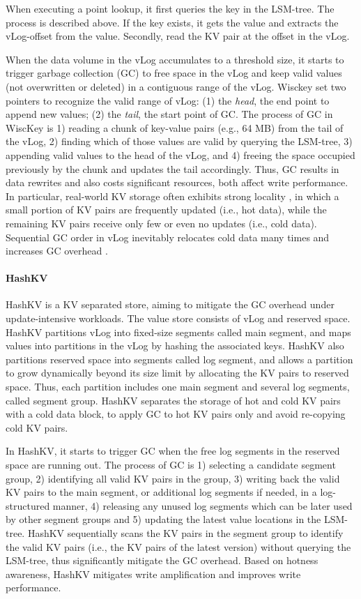 \documentclass[sigconf]{acmart}
\begin{document}
When executing a point lookup, it first queries the key in the LSM-tree. The process is described above. If the key exists, it gets the value and extracts the vLog-offset from the value. Secondly, read the KV pair at the offset in the vLog.

When the data volume in the vLog accumulates to a threshold size, it starts to trigger garbage collection (GC) to free space in the vLog and keep valid values (not overwritten or deleted) in a contiguous range of the vLog. Wisckey set two pointers to recognize the valid range of vLog: (1) the \textit{head}, the end point to append new values; (2) the \textit{tail}, the start point of GC. The process of GC in WiscKey is 1) reading a chunk of key-value pairs (e.g., 64 MB) from the tail of the vLog, 2) finding which of those values are valid by querying the LSM-tree, 3) appending valid values to the head of the vLog, and 4) freeing the space occupied previously by the chunk and updates the tail accordingly. Thus, GC results in data rewrites and also costs significant resources, both affect write performance.  In particular, real-world KV storage often exhibits strong locality \cite{Workload}, in which a small portion of KV pairs are frequently updated (i.e., hot data), while the remaining KV pairs receive only few or even no updates (i.e., cold data). Sequential GC order in vLog inevitably relocates cold data many times and increases GC overhead \cite{HashKV}.

\paragraph{HashKV} HashKV \cite{HashKV} is a KV separated store, aiming to mitigate the GC overhead under update-intensive workloads. The value store consists of vLog and reserved space. HashKV partitions vLog into fixed-size segments called main segment, and maps values into partitions in the vLog by hashing the associated keys. HashKV also partitions reserved space into segments called log segment, and allows a partition to grow dynamically beyond its size limit by allocating the KV pairs to reserved space. Thus, each partition includes one main segment and several log segments, called segment group. HashKV separates the storage of hot and cold KV pairs with a cold data block, to apply GC to hot KV pairs only and avoid re-copying cold KV pairs. 

In HashKV, it starts to trigger GC when the free log segments in the reserved space are running out. The process of GC is 1) selecting a candidate segment group, 2) identifying all valid KV pairs in the group, 3) writing back the valid KV pairs to the main segment, or additional log segments if needed, in a log-structured manner, 4) releasing any unused log segments which can be later used by other segment groups and 5) updating the latest value locations in the LSM-tree. HashKV sequentially scans the KV pairs in the segment group to identify the valid KV pairs (i.e., the KV pairs of the latest version) without querying the LSM-tree, thus significantly mitigate the GC overhead. Based on hotness awareness, HashKV mitigates write amplification and improves write performance.
\end{document}
